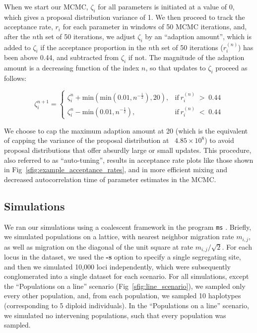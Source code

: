 \documentclass[10pt,letterpaper]{article}
\begin{document}
When we start our MCMC, $\zeta_i$ for all parameters is initiated at a value of 0, which gives a proposal distribution variance of 1.  We then proceed to track the acceptance rate, $r_i$ for each parameter in windows of 50 MCMC iterations, and, after the $n$th set of 50 iterations, we adjust $\zeta_i$ by an ``adaption amount'', which is added to $\zeta_i$ if the acceptance proportion in the $n$th set of 50 iterations ($r^{(n)}_i$) has been above 0.44, and subtracted from $\zeta_i$ if not.  The magnitude of the adaption amount is a decreasing function of the index $n$, so that updates to $\zeta_i$ proceed as follows:

\begin{equation}
\zeta^{n+1}_i =
\begin{cases}
\zeta^{n}_i + \text{min}(\text{min}(0.01,n^{-\frac{1}{2}}),20), & \text{if} \: r^{(n)}_i \; > \; 0.44 \\
\zeta^{n}_i - \text{min}(0.01,n^{-\frac{1}{2}}), & \text{if} \: r^{(n)}_i \; < \; 0.44
\end{cases}
\label{eq:adpative_mcmc}
\end{equation}

We choose to cap the maximum adaption amount at 20 (which is the equivalent of capping the variance of the proposal distribution at ~$4.85 \times 10^8$) to avoid proposal distributions that offer absurdly large or small updates.  This procedure, also referred to as ``auto-tuning'', results in acceptance rate plots like those shown in Fig\ \ref{sfig:example_acceptance_rates}, and in more efficient mixing and decreased autocorrelation time of parameter estimates in the MCMC.

\subsection*{Simulations}
We ran our simulations using a coalescent framework in the program \texttt{ms} \cite{Hudson2002}.  Briefly, we simulated populations on a lattice, with nearest neighbor migration rate $m_{i,j}$, as well as migration on the diagonal of the unit square at rate $m_{i,j}/\sqrt{2}$.  For each locus in the dataset, we used the \textbf{-s} option to specify a single segregating site, and then we simulated 10,000 loci independently, which were subsequently conglomerated into a single dataset for each scenario.  For all simulations, except the ``Populations on a line'' scenario (Fig\ \ref{sfig:line_scenario}), we sampled only every other population, and, from each population, we sampled 10 haplotypes (corresponding to 5 diploid individuals).  In the ``Populations on a line'' scenario, we simulated no intervening populations, such that every population was sampled.
\end{document}
